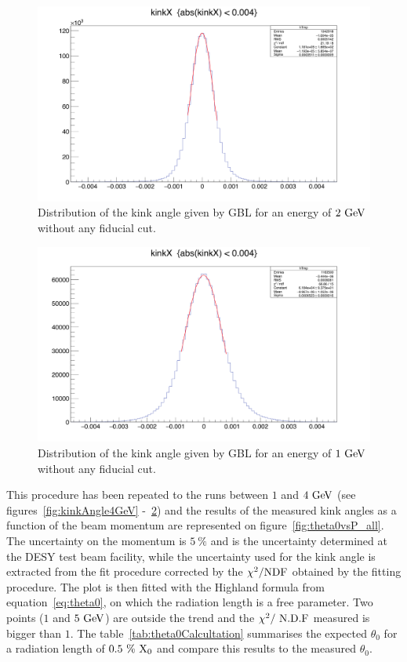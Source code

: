    \begin{figure}[!p]
     \centering
     \includegraphics[width = \textwidth]{Pictures/X0/kinkAngle2GeV.png}
     \caption{Distribution of the kink angle given by GBL for an energy of $2~\rm{GeV}$ without any fiducial cut.}
     \label{fig:kinkAngle2GeV}
   \end{figure} 

   \begin{figure}[!p]
     \centering
     \includegraphics[width = \textwidth]{Pictures/X0/kinkAngle1GeV.png}
     \caption{Distribution of the kink angle given by GBL for an energy of $1~\rm{GeV}$ without any fiducial cut.}
     \label{fig:kinkAngle1GeV}
   \end{figure} 

   This procedure has been repeated to the runs between $1$ and $4~\rm{GeV}$ (see figures~\ref{fig:kinkAngle4GeV} -~\ref{fig:kinkAngle1GeV}) and the results of the measured kink angles as a function of the beam momentum are represented on figure~\ref{fig:theta0vsP_all}. 
   The uncertainty on the momentum is $5~\%$ and is the uncertainty determined at the DESY test beam facility, while the uncertainty used for the kink angle is extracted from the fit procedure corrected by the $\chi^2 / \rm{NDF}$ obtained by the fitting procedure.
   The plot is then fitted with the Highland formula from equation~\ref{eq:theta0}, on which the radiation length is a free parameter.
   Two points ($1$ and $5~\rm{GeV}$) are outside the trend and the $\chi^2 /~\rm{N.D.F}$ measured is bigger than $1$.
   The table~\ref{tab:theta0Calcultation} summarises the expected $\theta_0$ for a radiation length of $0.5~\%~\rm{X_0}$ and compare this results to the measured $\theta_0$.

